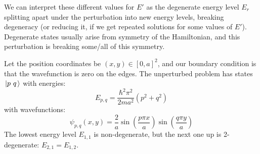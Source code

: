 \documentclass[../Main.tex]{subfiles}
\begin{document}
We can interpret these different values for $E'$ as the degenerate energy level $E_r$ splitting apart under the perturbation into new energy levels, breaking degeneracy (or reducing it, if we get repeated solutions for some values of $E'$). Degenerate states usually arise from symmetry of the Hamiltonian, and this perturbation is breaking some/all of this symmetry.
\begin{example}
    Let the position coordinates be $(x, y) \in [0, a]^2$, and our boundary condition is that the wavefunction is zero on the edges. The unperturbed problem has states $\left.\left|p~q\right.\right\rangle$ with energies:
    \begin{equation*}
        E_{p, q} = \frac{\hbar^2 \pi^2}{2ma^2} (p^2 + q^2)
    \end{equation*}
    with wavefunctions:
    \begin{equation*}
        \psi_{p, q}(x, y) = \frac2a \sin\left(\frac{p\pi x}{a}\right) \sin \left(\frac{q \pi y}{a}\right)
    \end{equation*}
    The lowest energy level $E_{1, 1}$ is non-degenerate, but the next one up is 2-degenerate: $E_{2, 1} = E_{1, 2}$.


\end{example}
\end{document}
